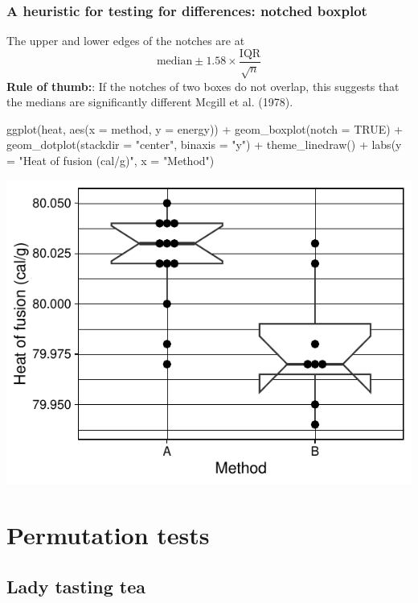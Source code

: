 \documentclass[a4paper]{article}\usepackage[]{graphicx}\usepackage[]{xcolor}
\makeatletter
\def\maxwidth{ %
  \ifdim\Gin@nat@width>\linewidth
    \linewidth
  \else
    \Gin@nat@width
  \fi
}
\makeatother
\begin{document}
\subsubsection{A heuristic for testing for differences: notched boxplot}
The upper and lower edges of the notches are at
\[
	\text{median} \pm 1.58 \times \frac{\text{IQR}}{\sqrt{n}}
\]
\textcolor{mygreen}{\textbf{Rule of thumb:}}: If the notches of two boxes do not overlap, this suggests that the medians are significantly different Mcgill et al. (1978).
\begin{Schunk}
\begin{Sinput}
ggplot(heat, aes(x = method, y = energy)) + 
geom_boxplot(notch = TRUE) + 
geom_dotplot(stackdir = "center",
	    	 binaxis = "y") +
theme_linedraw() + 
labs(y = "Heat of fusion (cal/g)",
     x = "Method")
\end{Sinput}


{\centering \includegraphics[width=\maxwidth]{figure/listings-unnamed-chunk-129-1} 

}

\end{Schunk}

\section{Permutation tests}\label{sec:16}
\subsection{Lady tasting tea}
\end{document}
